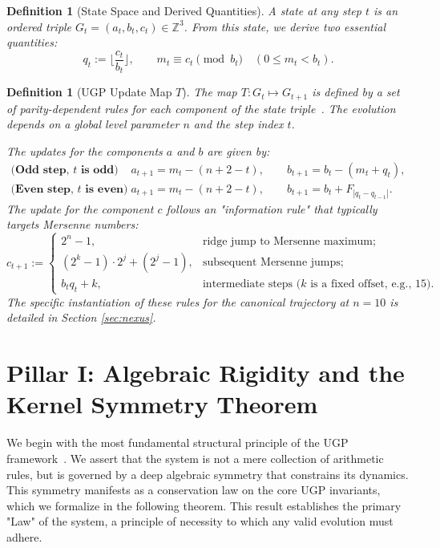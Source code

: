 \documentclass[12pt]{article}
\newtheorem{definition}[theorem]{Definition}
\numberwithin{equation}{section}
\newcommand{\Z}{\mathbb{Z}}
\begin{document}
\begin{definition}[State Space and Derived Quantities]\label{def:ugp_state_space}
A \emph{state} at any step $t$ is an ordered triple $G_t=(a_t,b_t,c_t)\in\Z^3$. From this state, we derive two essential quantities:
\[
q_t := \Big\lfloor \frac{c_t}{b_t}\Big\rfloor,\qquad
m_t \equiv c_t \pmod{b_t}\quad (0 \le m_t < b_t).
\]
\end{definition}

\begin{definition}[UGP Update Map $T$]\label{def:ugp_update_map}
The map $T: G_t \mapsto G_{t+1}$ is defined by a set of parity-dependent rules for each component of the state triple~\cite{SpivackUGPFormalization,ugp-lean}. The evolution depends on a global level parameter $n$ and the step index $t$.

The updates for the components $a$ and $b$ are given by:
\begin{align*}
\textbf{(Odd step, $t$ is odd)}\quad &a_{t+1}=m_t-(n+2-t),\qquad b_{t+1}=b_t-(m_t+q_t),\\
\textbf{(Even step, $t$ is even)}\quad &a_{t+1}=m_t-(n+2-t),\qquad b_{t+1}=b_t+F_{|q_t-q_{t-1}|}.
\end{align*}
The update for the component $c$ follows an "information rule" that typically targets Mersenne numbers:
\[
c_{t+1} :=
\begin{cases}
2^n - 1, & \text{ridge jump to Mersenne maximum;} \\
(2^{k}-1) \cdot 2^j + (2^j-1), & \text{subsequent Mersenne jumps;} \\
b_t q_t + k, & \text{intermediate steps ($k$ is a fixed offset, e.g., 15).}
\end{cases}
\]
The specific instantiation of these rules for the canonical trajectory at $n=10$ is detailed in Section \ref{sec:nexus}.
\end{definition}

\section{Pillar I: Algebraic Rigidity and the Kernel Symmetry Theorem}\label{sec:kernel_symmetry}

We begin with the most fundamental structural principle of the UGP framework~\cite{SpivackUGPFormalization,ugp-lean}. We assert that the system is not a mere collection of arithmetic rules, but is governed by a deep algebraic symmetry that constrains its dynamics. This symmetry manifests as a conservation law on the core UGP invariants, which we formalize in the following theorem. This result establishes the primary "Law" of the system, a principle of necessity to which any valid evolution must adhere.
\end{document}
